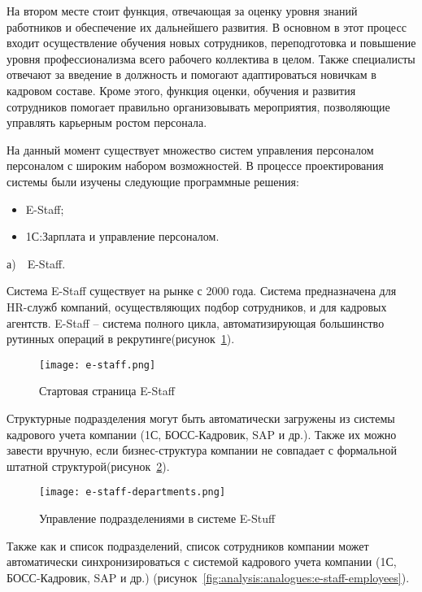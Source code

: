 На втором месте стоит функция, отвечающая за оценку уровня знаний работников и обеспечение их дальнейшего развития.
В основном в этот процесс входит осуществление обучения новых сотрудников, переподготовка и повышение уровня
профессионализма всего рабочего коллектива в целом. Также специалисты отвечают за введение в должность и помогают
адаптироваться новичкам в кадровом составе. Кроме этого, функция оценки, обучения и развития сотрудников помогает
правильно организовывать мероприятия, позволяющие управлять карьерным ростом персонала.

На данный момент существует множество систем управления персоналом персоналом с широким набором возможностей. В
процессе проектирования системы были изучены следующие программные решения:
\begin{itemize}
	\item E-Staff;
	\item 1С:Зарплата и управление персоналом.
\end{itemize}

а)~~E-Staff.

Система E-Staff существует на рынке с 2000 года. Система предназначена для HR-служб компаний, осуществляющих подбор
сотрудников, и для кадровых агентств. E-Staff -- система полного цикла, автоматизирующая большинство рутинных операций
в рекрутинге(рисунок~\ref{fig:analysis:analogues:e-staff}).
\pagebreak

\begin{figure}
	\centering
	\texttt{[image: e-staff.png]} 
	\caption{Стартовая страница E-Staff}
	\label{fig:analysis:analogues:e-staff}
\end{figure}

Структурные подразделения могут быть автоматически загружены из системы кадрового учета компании
(1С, БОСС-Кадровик, SAP и др.). Также их можно завести вручную, если бизнес-структура компании не совпадает с
формальной штатной структурой(рисунок~\ref{fig:analysis:analogues:e-staff-departments}).

\begin{figure}[!h]
	\centering
	\texttt{[image: e-staff-departments.png]} 
	\caption{Управление подразделениями в системе E-Stuff}
	\label{fig:analysis:analogues:e-staff-departments}
\end{figure}

Также как и список подразделений, список сотрудников компании может автоматически синхронизироваться с системой
кадрового учета компании (1С, БОСС-Кадровик, SAP и др.) (рисунок~\ref{fig:analysis:analogues:e-staff-employees}).

